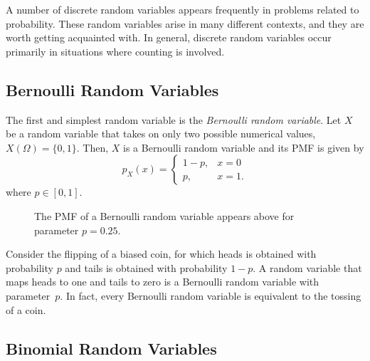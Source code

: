 A number of discrete random variables appears frequently in problems related to probability.
These random variables arise in many different contexts, and they are worth getting acquainted with.
In general, discrete random variables occur primarily in situations where counting is involved.


\subsection{Bernoulli Random Variables}

The first and simplest random variable is the \emph{Bernoulli random variable}. 
Let $X$ be a random variable that takes on only two possible numerical values, $X(\Omega) = \{0, 1\}$.
Then, $X$ is a Bernoulli random variable and its PMF is given by
\begin{equation*}
p_X (x) = \begin{cases}
1 - p, & x = 0 \\
p, & x = 1 .
\end{cases}
\end{equation*}
where $p \in [0, 1]$.

\begin{figure}[ht]
\begin{center}
\end{center}
\caption{The PMF of a Bernoulli random variable appears above for parameter $p = 0.25$.}
\end{figure}

\begin{example}
Consider the flipping of a biased coin, for which heads is obtained with probability $p$ and tails is obtained with probability $1-p$.
A random variable that maps heads to one and tails to zero is a Bernoulli random variable with parameter~$p$.
In fact, every Bernoulli random variable is equivalent to the tossing of a coin.
\end{example}


\subsection{Binomial Random Variables}
\label{subsection:BinormialRandomVariables}

